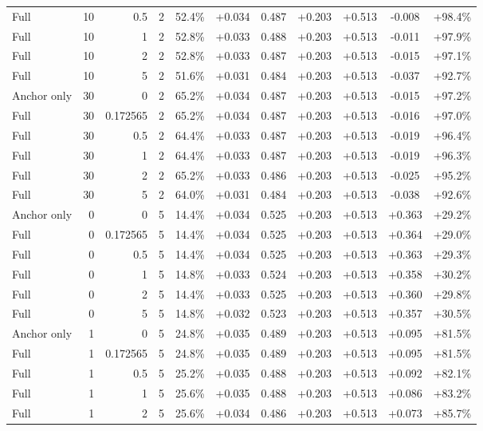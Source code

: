 \begin{table}[htbp]
\begin{tabular}{lrrrccccccc}
Full & 10 & 0.5 & 2 & 52.4\% & +0.034 & 0.487 & +0.203 & +0.513 & -0.008 & +98.4\% \\
Full & 10 & 1 & 2 & 52.8\% & +0.033 & 0.488 & +0.203 & +0.513 & -0.011 & +97.9\% \\
Full & 10 & 2 & 2 & 52.8\% & +0.033 & 0.487 & +0.203 & +0.513 & -0.015 & +97.1\% \\
Full & 10 & 5 & 2 & 51.6\% & +0.031 & 0.484 & +0.203 & +0.513 & -0.037 & +92.7\% \\
Anchor only & 30 & 0 & 2 & 65.2\% & +0.034 & 0.487 & +0.203 & +0.513 & -0.015 & +97.2\% \\
Full & 30 & 0.172565 & 2 & 65.2\% & +0.034 & 0.487 & +0.203 & +0.513 & -0.016 & +97.0\% \\
Full & 30 & 0.5 & 2 & 64.4\% & +0.033 & 0.487 & +0.203 & +0.513 & -0.019 & +96.4\% \\
Full & 30 & 1 & 2 & 64.4\% & +0.033 & 0.487 & +0.203 & +0.513 & -0.019 & +96.3\% \\
Full & 30 & 2 & 2 & 65.2\% & +0.033 & 0.486 & +0.203 & +0.513 & -0.025 & +95.2\% \\
Full & 30 & 5 & 2 & 64.0\% & +0.031 & 0.484 & +0.203 & +0.513 & -0.038 & +92.6\% \\
Anchor only & 0 & 0 & 5 & 14.4\% & +0.034 & 0.525 & +0.203 & +0.513 & +0.363 & +29.2\% \\
Full & 0 & 0.172565 & 5 & 14.4\% & +0.034 & 0.525 & +0.203 & +0.513 & +0.364 & +29.0\% \\
Full & 0 & 0.5 & 5 & 14.4\% & +0.034 & 0.525 & +0.203 & +0.513 & +0.363 & +29.3\% \\
Full & 0 & 1 & 5 & 14.8\% & +0.033 & 0.524 & +0.203 & +0.513 & +0.358 & +30.2\% \\
Full & 0 & 2 & 5 & 14.4\% & +0.033 & 0.525 & +0.203 & +0.513 & +0.360 & +29.8\% \\
Full & 0 & 5 & 5 & 14.8\% & +0.032 & 0.523 & +0.203 & +0.513 & +0.357 & +30.5\% \\
Anchor only & 1 & 0 & 5 & 24.8\% & +0.035 & 0.489 & +0.203 & +0.513 & +0.095 & +81.5\% \\
Full & 1 & 0.172565 & 5 & 24.8\% & +0.035 & 0.489 & +0.203 & +0.513 & +0.095 & +81.5\% \\
Full & 1 & 0.5 & 5 & 25.2\% & +0.035 & 0.488 & +0.203 & +0.513 & +0.092 & +82.1\% \\
Full & 1 & 1 & 5 & 25.6\% & +0.035 & 0.488 & +0.203 & +0.513 & +0.086 & +83.2\% \\
Full & 1 & 2 & 5 & 25.6\% & +0.034 & 0.486 & +0.203 & +0.513 & +0.073 & +85.7\% \\

\end{tabular}
\end{table}
